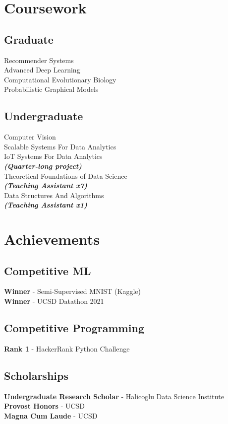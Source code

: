 \documentclass[]{devanshu-resume-openfont}
\begin{document}
\begin{minipage}[t]{0.33\textwidth}
\section{Coursework}
\subsection{Graduate}
Recommender Systems\\
Advanced Deep Learning\\
Computational Evolutionary Biology\\
Probabilistic Graphical Models\\
\sectionsep

\subsection{Undergraduate}
Computer Vision\\
Scalable Systems For Data Analytics\\
IoT Systems For Data Analytics\\
{\footnotesize \textit{\textbf{(Quarter-long project) }}} \\
Theoretical Foundations of Data Science\\
{\footnotesize \textit{\textbf{(Teaching Assistant x7) }}} \\
Data Structures And Algorithms\\
{\footnotesize \textit{\textbf{(Teaching Assistant x1) }}} \\

\sectionsep

\section{Achievements}
\subsection{Competitive ML}
\textbf{Winner} - Semi-Supervised MNIST (Kaggle)\\
\textbf{Winner} - UCSD Datathon 2021\\

\sectionsep
\subsection{Competitive Programming}
\textbf{Rank 1} - HackerRank Python Challenge

\sectionsep
\subsection{Scholarships}
\textbf{Undergraduate Research Scholar} - Halicoglu Data Science Institute\\
\textbf{Provost Honors} - UCSD\\
\textbf{Magna Cum Laude} - UCSD


\end{minipage}
\end{document}

